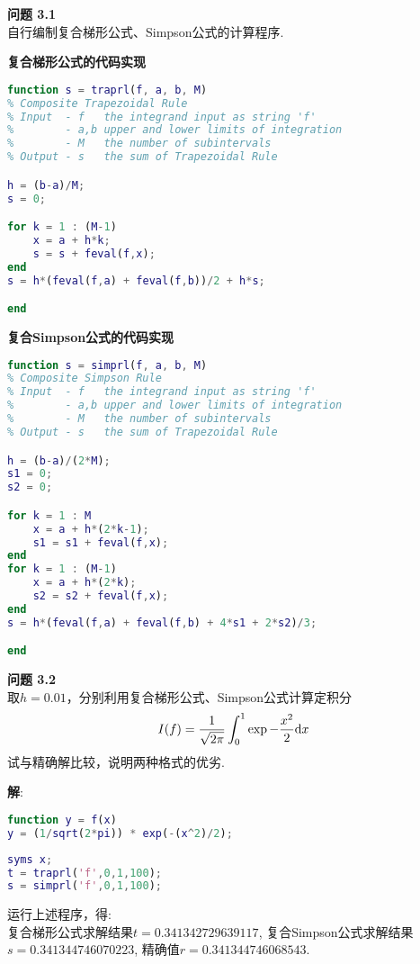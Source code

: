 \documentclass[UTF8]{ctexart}
\newenvironment{problem}[2][问题]
{\begin{mdframed}[backgroundcolor=gray!20] \textbf{#1 #2} \\}
	{\end{mdframed}}
\begin{document}
\begin{problem}{3.1}
	自行编制复合梯形公式、Simpson公式的计算程序.
\end{problem}
\textbf{复合梯形公式的代码实现}
\begin{lstlisting}[language=matlab]
function s = traprl(f, a, b, M)
% Composite Trapezoidal Rule
% Input  - f   the integrand input as string 'f'
%        - a,b upper and lower limits of integration
%        - M   the number of subintervals
% Output - s   the sum of Trapezoidal Rule

h = (b-a)/M;
s = 0;

for k = 1 : (M-1)
	x = a + h*k;
	s = s + feval(f,x);
end
s = h*(feval(f,a) + feval(f,b))/2 + h*s;

end
\end{lstlisting}
\textbf{复合Simpson公式的代码实现}
\begin{lstlisting}[language=matlab]
function s = simprl(f, a, b, M)
% Composite Simpson Rule
% Input  - f   the integrand input as string 'f'
%        - a,b upper and lower limits of integration
%        - M   the number of subintervals
% Output - s   the sum of Trapezoidal Rule

h = (b-a)/(2*M);
s1 = 0;
s2 = 0;

for k = 1 : M
	x = a + h*(2*k-1);
	s1 = s1 + feval(f,x);
end
for k = 1 : (M-1)
	x = a + h*(2*k);
	s2 = s2 + feval(f,x);
end
s = h*(feval(f,a) + feval(f,b) + 4*s1 + 2*s2)/3;

end
\end{lstlisting}

\begin{problem}{3.2}
	取$h=0.01$，分别利用复合梯形公式、Simpson公式计算定积分
	\begin{align}
		I(f)=\frac{1}{\sqrt{2 \pi}} \int_{0}^{1} \exp {-\frac{x^{2}}{2}} \mathrm{d} x\notag
	\end{align}
	试与精确解比较，说明两种格式的优劣.
\end{problem}
\textbf{解}:\\
\begin{lstlisting}[language=matlab]
function y = f(x)
y = (1/sqrt(2*pi)) * exp(-(x^2)/2);
\end{lstlisting}
\begin{lstlisting}[language=matlab]
syms x;
t = traprl('f',0,1,100);
s = simprl('f',0,1,100);
\end{lstlisting}
运行上述程序，得:\\
复合梯形公式求解结果$t = 0.341342729639117$, 
复合Simpson公式求解结果$s = 0.341344746070223$,
精确值$r = 0.341344746068543$.
\end{document}
